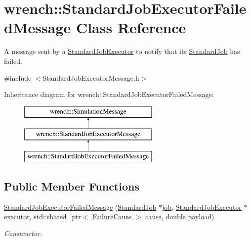 \hypertarget{classwrench_1_1_standard_job_executor_failed_message}{}\section{wrench\+:\+:Standard\+Job\+Executor\+Failed\+Message Class Reference}
\label{classwrench_1_1_standard_job_executor_failed_message}


A message sent by a \hyperlink{classwrench_1_1_standard_job_executor}{Standard\+Job\+Executor} to notify that its \hyperlink{classwrench_1_1_standard_job}{Standard\+Job} has failed.  




{\ttfamily \#include $<$Standard\+Job\+Executor\+Message.\+h$>$}

Inheritance diagram for wrench\+:\+:Standard\+Job\+Executor\+Failed\+Message\+:\begin{figure}[H]
\begin{center}
\leavevmode
\includegraphics[height=3.000000cm]{classwrench_1_1_standard_job_executor_failed_message}
\end{center}
\end{figure}
\subsection*{Public Member Functions}
\begin{DoxyCompactItemize}
\item 
\hyperlink{classwrench_1_1_standard_job_executor_failed_message_aee0fd99868b27ee8aae50aa11f4918fa}{Standard\+Job\+Executor\+Failed\+Message} (\hyperlink{classwrench_1_1_standard_job}{Standard\+Job} $\ast$\hyperlink{classwrench_1_1_standard_job_executor_failed_message_a91f2726c78576faf32f575f95aef3ee1}{job}, \hyperlink{classwrench_1_1_standard_job_executor}{Standard\+Job\+Executor} $\ast$\hyperlink{classwrench_1_1_standard_job_executor_failed_message_a5e3ba877c421ffa8315cdf6553879a8e}{executor}, std\+::shared\+\_\+ptr$<$ \hyperlink{classwrench_1_1_failure_cause}{Failure\+Cause} $>$ \hyperlink{classwrench_1_1_standard_job_executor_failed_message_a03339ea624a998d5112bacf453a8690f}{cause}, double \hyperlink{classwrench_1_1_simulation_message_a914f2732713f7c02898e66f05a7cb8a1}{payload})
\begin{DoxyCompactList}\small\item\em Constructor. \end{DoxyCompactList}\end{DoxyCompactItemize}
